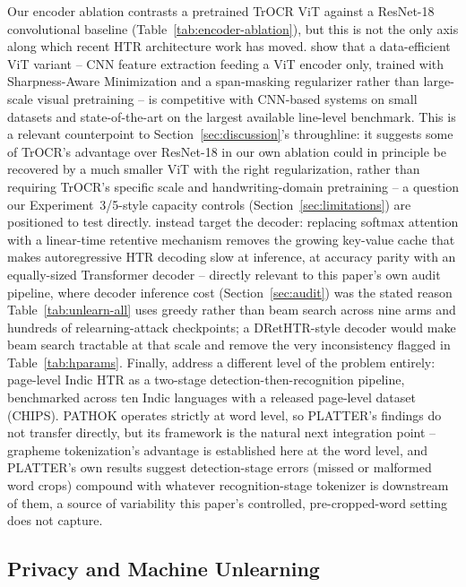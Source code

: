 \documentclass[a4paper,fleqn]{cas-dc}
\begin{document}
Our encoder ablation contrasts a pretrained TrOCR ViT against a ResNet-18
convolutional baseline (Table~\ref{tab:encoder-ablation}), but this is not
the only axis along which recent HTR architecture work has moved.
\citet{li2024htrvt} show that a data-efficient ViT variant -- CNN feature
extraction feeding a ViT encoder only, trained with Sharpness-Aware
Minimization and a span-masking regularizer rather than large-scale visual
pretraining -- is competitive with CNN-based systems on small datasets and
state-of-the-art on the largest available line-level benchmark. This is a
relevant counterpoint to Section~\ref{sec:discussion}'s throughline: it
suggests some of TrOCR's advantage over ResNet-18 in our own ablation could
in principle be recovered by a much smaller ViT with the right
regularization, rather than requiring TrOCR's specific scale and
handwriting-domain pretraining -- a question our Experiment~3/5-style
capacity controls (Section~\ref{sec:limitations}) are positioned to test
directly. \citet{kim2026drethtr} instead target the decoder: replacing
softmax attention with a linear-time retentive mechanism removes the
growing key-value cache that makes autoregressive HTR decoding slow at
inference, at accuracy parity with an equally-sized Transformer decoder --
directly relevant to this paper's own audit pipeline, where decoder
inference cost (Section~\ref{sec:audit}) was the stated reason
Table~\ref{tab:unlearn-all} uses greedy rather than beam search across nine
arms and hundreds of relearning-attack checkpoints; a DRetHTR-style decoder
would make beam search tractable at that scale and remove the very
inconsistency flagged in Table~\ref{tab:hparams}. Finally,
\citet{kasuba2025platter} address a different level of the problem
entirely: page-level Indic HTR as a two-stage detection-then-recognition
pipeline, benchmarked across ten Indic languages with a released
page-level dataset (CHIPS). PATHOK operates strictly at word level, so
PLATTER's findings do not transfer directly, but its framework is the
natural next integration point -- grapheme tokenization's advantage is
established here at the word level, and PLATTER's own results suggest
detection-stage errors (missed or malformed word crops) compound with
whatever recognition-stage tokenizer is downstream of them, a source of
variability this paper's controlled, pre-cropped-word setting does not
capture.

\subsection{Privacy and Machine Unlearning}
\label{sec:related-unlearning}
\end{document}
